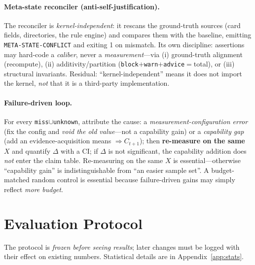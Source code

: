 \documentclass{article}
\begin{document}
\paragraph{Meta-state reconciler (anti-self-justification).}
\label{sec:reconciler}
The reconciler is \emph{kernel-independent}: it rescans the ground-truth sources (card fields,
directories, the rule engine) and compares them with the baseline, emitting
\texttt{META-STATE-CONFLICT} and exiting 1 on mismatch. Its own discipline: assertions may
hard-code a \emph{caliber}, never a \emph{measurement}---via (i) ground-truth alignment
(recompute), (ii) additivity/partition (\texttt{block}$+$\texttt{warn}$+$\texttt{advice}$=$total),
or (iii) structural invariants. Residual: ``kernel-independent'' means it does not import the
kernel, \emph{not} that it is a third-party implementation.

\paragraph{Failure-driven loop.} For every \texttt{miss}$\cup$\texttt{unknown}, attribute the
cause: a \emph{measurement-configuration error} (fix the config and \emph{void the old value}---not
a capability gain) or a \emph{capability gap} (add an evidence-acquisition means $\Rightarrow
C_{t+1}$); then \textbf{re-measure on the same $X$} and quantify $\Delta$ with a CI; if $\Delta$ is
not significant, the capability addition does \emph{not} enter the claim table. Re-measuring on the
same $X$ is essential---otherwise ``capability gain'' is indistinguishable from ``an easier sample
set''. A budget-matched random control is essential because failure-driven gains may simply reflect
\emph{more budget}.

\section{Evaluation Protocol}
\label{sec:protocol}
The protocol is \emph{frozen before seeing results}; later changes must be logged with their effect
on existing numbers. Statistical details are in Appendix~\ref{app:stats}.
\end{document}
